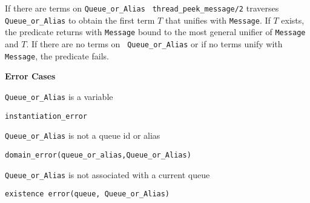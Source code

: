 \begin{description}
%
If there are terms on {\tt Queue\_or\_Alias} {\tt
  thread\_peek\_message/2} traverses {\tt Queue\_or\_Alias} to obtain
the first term $T$ that unifies with {\tt Message}.  If $T$ exists,
the predicate returns with {\tt Message} bound to the most general
unifier of {\tt Message} and $T$.  If there are no terms on {\tt
  Queue\_or\_Alias} or if no terms unify with {\tt Message}, the predicate fails.

{\bf Error Cases}
\bi
\item 	{\tt Queue\_or\_Alias} is a variable
\bi
\item 	{\tt instantiation\_error}
\ei
%
\item 	{\tt Queue\_or\_Alias} is not a queue id or alias
\bi
\item 	{\tt domain\_error(queue\_or\_alias,Queue\_or\_Alias)}
\ei
\item {\tt Queue\_or\_Alias} is not associated with a current queue
\bi
\item   {\tt existence error(queue, Queue\_or\_Alias)}
\ei
\ei
%



\end{description}



